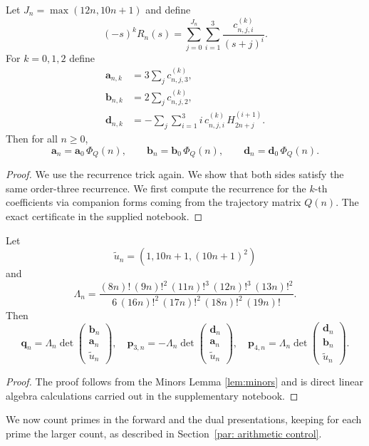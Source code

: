 \begin{lemma}
\label{lem: dual sum}
Let $J_n=\max(12n,10n+1)$ and define
\[
  (-s)^kR_n(s)
  =\sum_{j=0}^{J_n}\sum_{i=1}^3
    \frac{c^{(k)}_{n,j,i}}{(s+j)^i}.
\]
    For $k=0,1,2$ define
\begin{align*}
  \mathbf a_{n,k}&=3\sum_jc^{(k)}_{n,j,3},\\
  \mathbf b_{n,k}&=2\sum_jc^{(k)}_{n,j,2},\\
  \mathbf d_{n,k}&=-\sum_j\sum_{i=1}^3i\,c^{(k)}_{n,j,i}\,H^{(i+1)}_{2n+j}.
\end{align*}
Then for all $n\ge0$,
\[
  \mathbf a_n=\mathbf a_0\,\Phi_Q(n),\qquad \mathbf b_n=\mathbf b_0\,\Phi_Q(n),\qquad
  \mathbf d_n=\mathbf d_0\,\Phi_Q(n).
\]
\end{lemma}
\begin{proof}
    We use the recurrence trick again. We show that both sides satisfy the same order-three recurrence. We first compute the recurrence for the $k$-th coefficients via companion forms coming from the trajectory matrix $Q(n)$. The exact certificate in the supplied notebook.
\end{proof}


\begin{lemma}\label{prop:z34-dual}
Let 
\[
\tilde u_n=(1,10n+1,(10n+1)^2)
\]
and 
 \[
  \Lambda_n=\frac{(8n)!\,(9n)!^2\,(11n)!^3\,(12n)!^3\,(13n)!^2}
                 {6\,(16n)!^2\,(17n)!^2\,(18n)!^2\,(19n)!}.
\]
Then
\[
  \mathbf q_n=\Lambda_n\det\begin{pmatrix}\mathbf b_n\\\mathbf a_n\\\tilde u_n\end{pmatrix},\quad
  \mathbf p_{3,n}=-\Lambda_n\det\begin{pmatrix}\mathbf d_n\\\mathbf a_n\\\tilde u_n\end{pmatrix},\quad
  \mathbf p_{4,n}=\Lambda_n\det\begin{pmatrix}\mathbf d_n\\\mathbf b_n\\\tilde u_n\end{pmatrix}.
\]
\end{lemma}
\begin{proof}
The proof follows from the Minors Lemma \ref{lem:minors} and is direct linear algebra calculations carried out in the supplementary notebook.
\end{proof}
%
We now count primes in the forward and the dual presentations, keeping for each prime the larger count, as described in Section~\ref{par: arithmetic control}.

